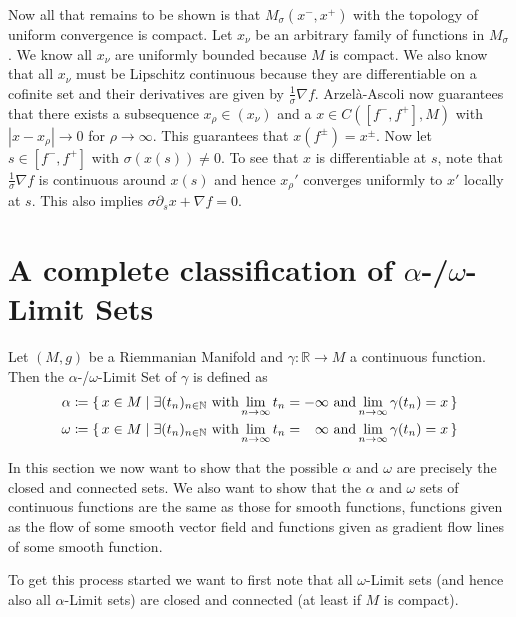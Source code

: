 \documentclass{article}
\begin{document}
	Now all that remains to be shown is that $M_\sigma(x^-,x^+)$ with the topology
	of uniform convergence is compact. Let $x_\nu$ be an arbitrary family of
	functions in $M_\sigma$. We know all $x_\nu$ are uniformly bounded because
	$M$ is compact. We also know that all $x_\nu$ must be Lipschitz continuous
	because they are differentiable on a cofinite set and their derivatives
	are given by $\frac 1 \sigma \nabla f$. Arzelà-Ascoli now guarantees
	that there exists a subsequence $x_\rho \in (x_\nu)$ and a $x \in C([f^-,f^+], M)$ with
	$|x - x_\rho| \to 0$ for $\rho \to \infty$. This guarantees that
	$x(f^\pm) = x^\pm$. Now let $s \in [f^-,f^+]$ with $\sigma(x(s)) \neq 0$.
	To see that $x$ is differentiable at $s$, note that $\frac 1 \sigma \nabla f$
	is continuous around $x(s)$ and hence $x_\rho'$ converges uniformly to
	$x'$ locally at $s$. This also implies $\sigma \partial_s x + \nabla f = 0$.
	
	\section{A complete classification of $\alpha$-/$\omega$-Limit Sets}
	Let $(M,g)$ be a Riemmanian Manifold and $\gamma: \mathbb R \to M$ a
	continuous function. Then the $\alpha$-/$\omega$-Limit Set of $\gamma$
	is defined as
	\begin{align*}
		\alpha &\coloneq \set{x \in M \mid \exists (t_n)_{n\in \mathbb N} \text{ with} \lim_{n \to \infty} t_n = -\infty \text{ and} \lim_{n \to \infty} \gamma(t_n) = x} \\
		\omega &\coloneq \set{x \in M \mid \exists (t_n)_{n\in \mathbb N} \text{ with} \lim_{n \to \infty} t_n = \phantom -\infty \text{ and} \lim_{n \to \infty} \gamma(t_n) = x} \\
	\end{align*}
	
	In this section we now want to show that the possible $\alpha$ and $\omega$
	are precisely the closed and connected sets. We also want to show that
	the $\alpha$ and $\omega$ sets of continuous functions are the same
	as those for smooth functions, functions given as the flow of some smooth vector
	field and functions given as gradient flow lines of some smooth function.
	
	To get this process started we want to first note that all $\omega$-Limit
	sets (and hence also all $\alpha$-Limit sets) are closed and connected
	(at least if $M$ is compact).
	
\end{document}
